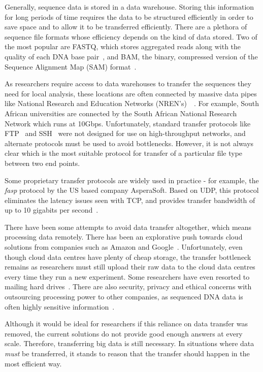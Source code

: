 \documentclass{sig-alternate-05-2015}
\begin{document}
Generally, sequence data is stored in a data warehouse. Storing this information for long periods of time requires the data to be structured efficiently in order to save space and to allow it to be transferred efficiently.
There are a plethora of sequence file formats whose efficiency depends on the kind of data stored. Two of the most popular are FASTQ, which stores aggregated reads along with the quality of each DNA base pair~\cite{cock2010sanger}, and BAM, the binary, compressed version of the Sequence Alignment Map (SAM) format~\cite{SAMspec}.

As researchers require access to data warehouses to transfer the sequences they need for local analysis, these locations are often connected by massive data pipes like National Research and Education Networks (NREN's)~\cite{sanren}~\cite{van2011unlocking}. For example, South African universities are connected by the South African National Research Network which runs at 10Gbps. Unfortunately, standard transfer protocols like FTP~\cite{venkatachalam2007openssh} and SSH~\cite{venkatachalam2007openssh} were not designed for use on high-throughput networks, and alternate protocols must be used to avoid bottlenecks. However, it is not always clear which is the most suitable protocol for transfer of a particular file type between two end points.

Some proprietary transfer protocols are widely used in practice - for example, the \textit{fasp} protocol by the US based company AsperaSoft. Based on UDP, this protocol eliminates the latency issues seen with TCP, and provides transfer bandwidth of up to 10 gigabits per second~\cite{fan2010petabytes}.

There have been some attempts to avoid data transfer altogether, which means processing data remotely. There has been an explorative push towards cloud solutions from companies such as Amazon and Google~\cite{baker2010next}. Unfortunately, even though cloud data centres have plenty of cheap storage, the transfer bottleneck remains as researchers must still upload their raw data to the cloud data centres every time they run a new experiment. Some researchers have even resorted to mailing hard drives~\cite{baker2010next}.
There are also security, privacy and ethical concerns with outsourcing processing power to other companies, as sequenced DNA data is often highly sensitive information~\cite{marx2013biology}.

Although it would be ideal for researchers if this reliance on data transfer was removed, the current solutions do not provide good enough answers at every scale. Therefore, transferring big data is still necessary.
In situations where data \textit{must} be transferred, it stands to reason that the transfer should happen in the most efficient way.
\end{document}
